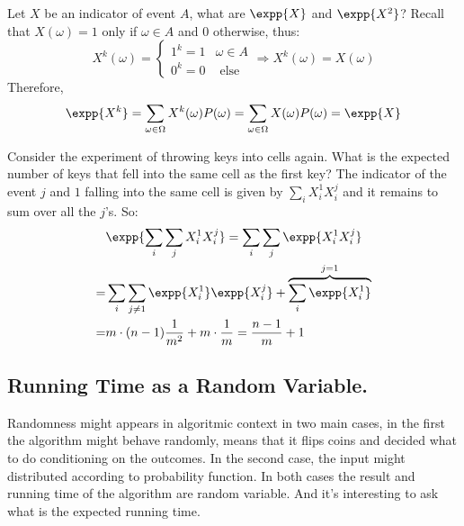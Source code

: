 \begin{example} Let $X$ be an indicator of event $A$, what are $\expp{X}$ and $\expp{X^{2}}$? Recall that $X(\omega) = 1$ only if $\omega \in A$ and $0$ otherwise, thus: 
  \begin{equation*}
    X^{k}(\omega) = \begin{cases}
      1^{k} = 1 & \omega \in A \\
      0^{k} = 0 & \text{ else }
    \end{cases} \Rightarrow X^{k}(\omega) = X(\omega)
  \end{equation*}
  Therefore, 
  \begin{equation*}
    \begin{split}
      \expp{X^{k}} = \sum_{\omega \in \Omega}{ X^{k}(\omega)  P(\omega)  } = \sum_{\omega \in \Omega}{ X(\omega)  P(\omega)  }=\expp{X} 
    \end{split}
  \end{equation*}
\end{example}
\begin{example}
  
Consider the experiment of throwing keys into cells again. What is the expected number of keys that fell into the same cell as the first key?  The indicator of the event $j$ and $1$ falling into the same cell is given by $\sum_{i}X_{i}^{1}X_{i}^{j}$ and it remains to sum over all the $j$'s. So:
  \begin{equation*}
    \begin{split}
      & \expp{ \sum_{i}\sum_{j}X_{i}^{1}X_{i}^{j}} = \sum_{i}\sum_{j}\expp{X_{i}^{1}X_{i}^{j}} \\  
      = &   \sum_{i}\sum_{j\neq 1}\expp{X_{i}^{1}}\expp{X_{i}^{j}} +  \overbrace{\sum_{i}\expp{X_{i}^{1}}}^{ j = 1} \\ 
      = & m \cdot (n-1) \frac{1}{m^{2}} + m\cdot \frac{1}{m} = \frac{n-1}{m} + 1 
    \end{split}
  \end{equation*}
\end{example}
\subsection{Running Time as a Random Variable.}
Randomness might appears in algoritmic context in two main cases, in the first the algorithm might behave randomly, means that it flips coins and decided what to do conditioning on the outcomes. In the second case, the input might distributed according to probability function. In both cases the result and running time of the algorithm are random variable. And it's interesting to ask what is the expected running time.

